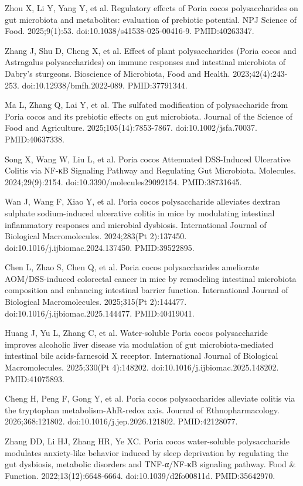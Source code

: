 \documentclass[12pt,oneside]{book}
\newcommand{\reff}[2]{\par\hangindent=7mm\hangafter=1\noindent[#1]\hspace{2mm}#2\par}
\begin{document}
\reff{18}{Zhou X, Li Y, Yang Y, et al. Regulatory effects of Poria cocos polysaccharides on gut microbiota and metabolites: evaluation of prebiotic potential. NPJ Science of Food. 2025;9(1):53. doi:10.1038/s41538-025-00416-9. PMID:40263347.}

\reff{19}{Zhang J, Shu D, Cheng X, et al. Effect of plant polysaccharides (Poria cocos and Astragalus polysaccharides) on immune responses and intestinal microbiota of Dabry's sturgeons. Bioscience of Microbiota, Food and Health. 2023;42(4):243-253. doi:10.12938/bmfh.2022-089. PMID:37791344.}

\reff{20}{Ma L, Zhang Q, Lai Y, et al. The sulfated modification of polysaccharide from Poria cocos and its prebiotic effects on gut microbiota. Journal of the Science of Food and Agriculture. 2025;105(14):7853-7867. doi:10.1002/jsfa.70037. PMID:40637338.}

\reff{21}{Song X, Wang W, Liu L, et al. Poria cocos Attenuated DSS-Induced Ulcerative Colitis via NF-κB Signaling Pathway and Regulating Gut Microbiota. Molecules. 2024;29(9):2154. doi:10.3390/molecules29092154. PMID:38731645.}

\reff{22}{Wan J, Wang F, Xiao Y, et al. Poria cocos polysaccharide alleviates dextran sulphate sodium-induced ulcerative colitis in mice by modulating intestinal inflammatory responses and microbial dysbiosis. International Journal of Biological Macromolecules. 2024;283(Pt 2):137450. doi:10.1016/j.ijbiomac.2024.137450. PMID:39522895.}

\reff{23}{Chen L, Zhao S, Chen Q, et al. Poria cocos polysaccharides ameliorate AOM/DSS-induced colorectal cancer in mice by remodeling intestinal microbiota composition and enhancing intestinal barrier function. International Journal of Biological Macromolecules. 2025;315(Pt 2):144477. doi:10.1016/j.ijbiomac.2025.144477. PMID:40419041.}

\reff{24}{Huang J, Yu L, Zhang C, et al. Water-soluble Poria cocos polysaccharide improves alcoholic liver disease via modulation of gut microbiota-mediated intestinal bile acids-farnesoid X receptor. International Journal of Biological Macromolecules. 2025;330(Pt 4):148202. doi:10.1016/j.ijbiomac.2025.148202. PMID:41075893.}

\reff{25}{Cheng H, Peng F, Gong Y, et al. Poria cocos polysaccharides alleviate colitis via the tryptophan metabolism-AhR-redox axis. Journal of Ethnopharmacology. 2026;368:121802. doi:10.1016/j.jep.2026.121802. PMID:42128077.}

\reff{26}{Zhang DD, Li HJ, Zhang HR, Ye XC. Poria cocos water-soluble polysaccharide modulates anxiety-like behavior induced by sleep deprivation by regulating the gut dysbiosis, metabolic disorders and TNF-α/NF-κB signaling pathway. Food \& Function. 2022;13(12):6648-6664. doi:10.1039/d2fo00811d. PMID:35642970.}
\end{document}
